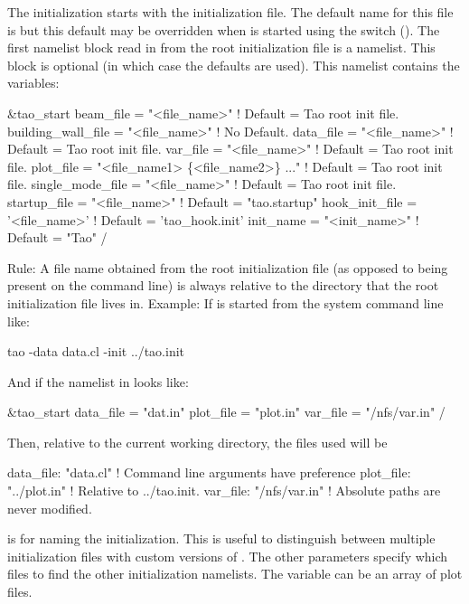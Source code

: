 The initialization starts with the  \tao initialization file. The default name for this
file is  but this default may be overridden when \tao is started using the 
switch (). The first namelist block read in from the root initialization file is a
 namelist. This block is optional (in which case the defaults are used).  This
namelist contains the variables:
\begin{example}
  &tao_start
    beam_file          = "<file_name>"  ! Default = Tao root init file.
    building_wall_file = "<file_name>"  ! No Default.
    data_file          = "<file_name>"  ! Default = Tao root init file.
    var_file           = "<file_name>"  ! Default = Tao root init file.
    plot_file          = "<file_name1> \{<file_name2>\} ..."  
                                        ! Default = Tao root init file.
    single_mode_file   = "<file_name>"  ! Default = Tao root init file.
    startup_file       = "<file_name>"  ! Default = "tao.startup"
    hook_init_file     = '<file_name>'  ! Default = 'tao_hook.init'
    init_name          = "<init_name>"  ! Default = "Tao"
  /
\end{example}
Rule: A file name obtained from the \tao root initialization file (as opposed to being present on
the command line) is always relative to the directory that the \tao root initialization file lives
in. Example: If \tao is started from the system command line like:
\begin{example}
    tao -data data.cl -init ../tao.init
\end{example}
And if the  namelist in  looks like:
\begin{example}
  &tao_start
    data_file = "dat.in"
    plot_file = "plot.in"
    var_file  = "/nfs/var.in"
  /
\end{example}
Then, relative to the current working directory, the files used will be
\begin{example}
  data_file: "data.cl"      ! Command line arguments have preference
  plot_file: "../plot.in"   ! Relative to ../tao.init.
  var_file:  "/nfs/var.in"  ! Absolute paths are never modified.
\end{example}

 is for naming the initialization. This is useful to distinguish between multiple
initialization files with custom versions of \tao. The other parameters specify which files to find
the other initialization namelists. The  variable can be an array of plot files.

